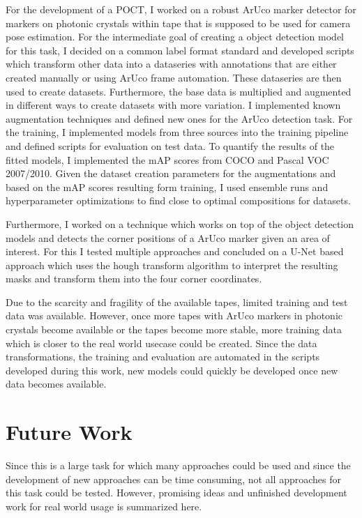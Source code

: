 \documentclass[10pt]{book}
\begin{document}
For the development of a \ac{POCT}, I worked on a robust \ac{ArUco} marker detector for markers on photonic crystals within tape that is supposed to be used for camera pose estimation. For the intermediate goal of creating a object detection model for this task, I decided on a common label format standard and developed scripts which transform other data into a dataseries with annotations that are either created manually or using \ac{ArUco} frame automation. These dataseries are then used to create datasets. Furthermore, the base data is multiplied and augmented in different ways to create datasets with more variation. I implemented known augmentation techniques and defined new ones for the \ac{ArUco} detection task. For the training, I implemented models from three sources into the training pipeline and defined scripts for evaluation on test data. To quantify the results of the fitted models, I implemented the \ac{mAP} scores from \ac{COCO} and Pascal VOC 2007/2010. Given the dataset creation parameters for the augmentations and based on the \ac{mAP} scores resulting form training, I used ensemble runs and hyperparameter optimizations to find close to optimal compositions for datasets. 

Furthermore, I worked on a technique which works on top of the object detection models and detects the corner positions of a \ac{ArUco} marker given an area of interest. For this I tested multiple approaches and concluded on a U-Net based approach which uses the hough transform algorithm to interpret the resulting masks and transform them into the four corner coordinates.

Due to the scarcity and fragility of the available tapes, limited training and test data was available. However, once more tapes with \ac{ArUco} markers in photonic crystals become available or the tapes become more stable, more training data which is closer to the real world usecase could be created. Since the data transformations, the training and evaluation are automated in the scripts developed during this work, new models could quickly be developed once new data becomes available.

\section{Future Work}

Since this is a large task for which many approaches could be used and since the development of new approaches can be time consuming, not all approaches for this task could be tested. However, promising ideas and unfinished development work for real world usage is summarized here.
\end{document}
